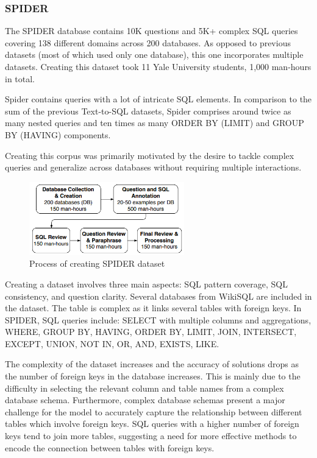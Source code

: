 \subsubsection{SPIDER}

The SPIDER database contains 10K questions and 5K+ complex SQL queries covering 138 different domains across 200 databases. As opposed to previous datasets (most of which used only one database), this one incorporates multiple datasets. Creating this dataset took 11 Yale University students, 1,000 man-hours in total.

Spider contains queries with a lot of intricate SQL elements. In comparison to the sum of the previous Text-to-SQL datasets, Spider comprises around twice as many nested queries and ten times as many ORDER BY (LIMIT) and GROUP BY (HAVING) components.

Creating this corpus was primarily motivated by the desire to tackle complex queries and generalize across databases without requiring multiple interactions.

\begin{figure}[htb]
    \centering
    \includegraphics[width=0.6\textwidth]{pics/db/Spider.png}
    \caption{Process of creating SPIDER dataset\cite{yu_spider_2019}}
    \label{fig:Spider}
\end{figure}

Creating a dataset involves three main aspects: SQL pattern coverage, SQL consistency, and question clarity. Several databases from WikiSQL are included in the dataset. The table is complex as it links several tables with foreign keys. In SPIDER, SQL queries include: SELECT with multiple columns and aggregations, WHERE, GROUP BY, HAVING, ORDER BY, LIMIT, JOIN, INTERSECT, EXCEPT, UNION, NOT IN, OR, AND, EXISTS, LIKE.

The complexity of the dataset increases and the accuracy of solutions drops as the number of foreign keys in the database increases. This is mainly due to the difficulty in selecting the relevant column and table names from a complex database schema. Furthermore, complex database schemas present a major challenge for the model to accurately capture the relationship between different tables which involve foreign keys. SQL queries with a higher number of foreign keys tend to join more tables, suggesting a need for more effective methods to encode the connection between tables with foreign keys.

